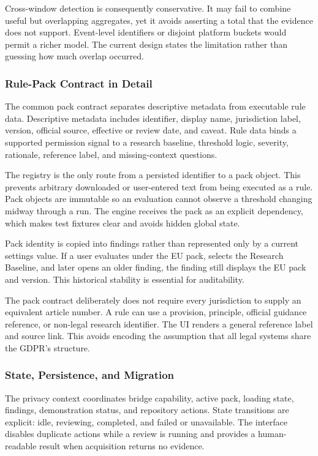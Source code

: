 Cross-window detection is consequently conservative. It may fail to combine useful but overlapping aggregates, yet it avoids asserting a total that the evidence does not support. Event-level identifiers or disjoint platform buckets would permit a richer model. The current design states the limitation rather than guessing how much overlap occurred.

\subsubsection{Rule-Pack Contract in Detail}

The common pack contract separates descriptive metadata from executable rule data. Descriptive metadata includes identifier, display name, jurisdiction label, version, official source, effective or review date, and caveat. Rule data binds a supported permission signal to a research baseline, threshold logic, severity, rationale, reference label, and missing-context questions.

The registry is the only route from a persisted identifier to a pack object. This prevents arbitrary downloaded or user-entered text from being executed as a rule. Pack objects are immutable so an evaluation cannot observe a threshold changing midway through a run. The engine receives the pack as an explicit dependency, which makes test fixtures clear and avoids hidden global state.

Pack identity is copied into findings rather than represented only by a current settings value. If a user evaluates under the EU pack, selects the Research Baseline, and later opens an older finding, the finding still displays the EU pack and version. This historical stability is essential for auditability.

The pack contract deliberately does not require every jurisdiction to supply an equivalent article number. A rule can use a provision, principle, official guidance reference, or non-legal research identifier. The UI renders a general reference label and source link. This avoids encoding the assumption that all legal systems share the GDPR's structure.

\subsubsection{State, Persistence, and Migration}

The privacy context coordinates bridge capability, active pack, loading state, findings, demonstration status, and repository actions. State transitions are explicit: idle, reviewing, completed, and failed or unavailable. The interface disables duplicate actions while a review is running and provides a human-readable result when acquisition returns no evidence.

